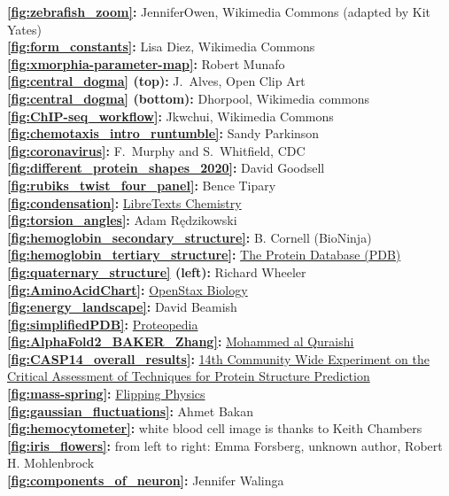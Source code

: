 \textbf{\autoref{fig:zebrafish_zoom}:} JenniferOwen, Wikimedia Commons (adapted by Kit Yates)\\
\textbf{\autoref{fig:form_constants}:} Lisa Diez, Wikimedia Commons\\
\textbf{\autoref{fig:xmorphia-parameter-map}:} Robert Munafo\\
\textbf{\autoref{fig:central_dogma} (top):} J.~Alves, Open Clip Art\\
\textbf{\autoref{fig:central_dogma} (bottom):} Dhorpool, Wikimedia commons\\
\textbf{\autoref{fig:ChIP-seq_workflow}:} Jkwchui, Wikimedia Commons\\
\textbf{\autoref{fig:chemotaxis_intro_runtumble}:} Sandy Parkinson\\
\textbf{\autoref{fig:coronavirus}:} F.~Murphy and S.~Whitfield, CDC\\
\textbf{\autoref{fig:different_protein_shapes_2020}:} David Goodsell\\
\textbf{\autoref{fig:rubiks_twist_four_panel}:} Bence Tipary\\
\textbf{\autoref{fig:condensation}:} \href{https://bit.ly/3q0Ph8V}{LibreTexts Chemistry}\\
\textbf{\autoref{fig:torsion_angles}:} Adam Rędzikowski\\
\textbf{\autoref{fig:hemoglobin_secondary_structure}:} B. Cornell (BioNinja)\\
\textbf{\autoref{fig:hemoglobin_tertiary_structure}:} \href{https://www.rcsb.org/structure/1SI4}{The Protein Database (PDB)}\\
\textbf{\autoref{fig:quaternary_structure} (left):} Richard Wheeler\\
\textbf{\autoref{fig:AminoAcidChart}:} \href{https://openstax.org/books/biology/pages/1-introduction}{OpenStax Biology}\\
\textbf{\autoref{fig:energy_landscape}:} David Beamish\\
\textbf{\autoref{fig:simplifiedPDB}:} \href{https://proteopedia.org/wiki/index.php/Atomic_coordinate_file}{Proteopedia}\\
\textbf{\autoref{fig:AlphaFold2_BAKER_Zhang}:} \href{https://bit.ly/39Mnym3}{Mohammed al Quraishi}\\
\textbf{\autoref{fig:CASP14_overall_results}:} \href{https://predictioncenter.org/casp14/zscores_final.cgi}{14th Community Wide Experiment on the Critical Assessment of Techniques for Protein Structure Prediction}\\
\textbf{\autoref{fig:mass-spring}:} \href{flippingphysics.com}{Flipping Physics}\\
\textbf{\autoref{fig:gaussian_fluctuations}:} Ahmet Bakan\\
\textbf{\autoref{fig:hemocytometer}:} white blood cell image is thanks to Keith Chambers\\
\textbf{\autoref{fig:iris_flowers}:} from left to right: Emma Forsberg, unknown author, Robert H. Mohlenbrock\\
\textbf{\autoref{fig:components_of_neuron}:} Jennifer Walinga\\



\clearpage
\thispagestyle{empty}
\phantom{}
